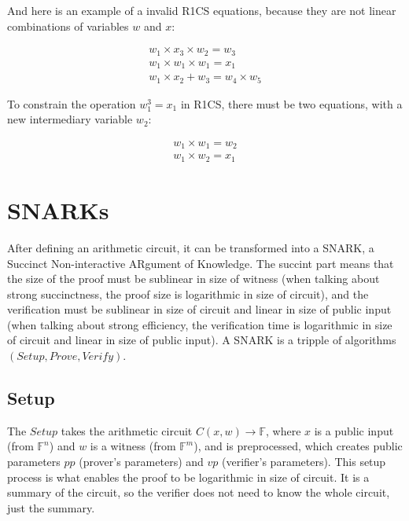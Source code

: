 And here is an example of a invalid R1CS equations, because they are not linear
combinations of variables $w$ and $x$:

\begin{displaymath}
	\begin{array}{l}
		w_1 \times x_3 \times w_2 = w_3	\\
		w_1 \times w_1 \times w_1 = x_1	\\
		w_1 \times x_2 + w_3 = w_4 \times w_5
	\end{array}
\end{displaymath}

To constrain the operation $w_1^3 = x_1$ in R1CS, there must be two equations, with
a new intermediary variable $w_2$:

\begin{displaymath}
	\begin{array}{l}
		w_1 \times w_1 = w_2	\\
		w_1 \times w_2 = x_1
	\end{array}
\end{displaymath}

\section{SNARKs}

After defining an arithmetic circuit, it can be transformed into a SNARK,
a Succinct Non-interactive ARgument of Knowledge. The succint part means that
the size of the proof must be sublinear in size of witness (when talking about
strong succinctness, the proof size is logarithmic in size of circuit), and
the verification must be sublinear in size of circuit and linear in size of
public input (when talking about strong efficiency, the verification time is
logarithmic in size of circuit and linear in size of public input).
A SNARK is a tripple of algorithms $(Setup, Prove, Verify)$.

\subsection{Setup}

The $Setup$ takes
the arithmetic circuit $C(x, w) \rightarrow \mathbb{F}$, where $x$ is a public
input (from $\mathbb{F}^n$) and $w$ is a witness (from $\mathbb{F}^m$), and
is preprocessed, which creates public parameters $pp$ (prover's parameters)
and $vp$ (verifier's parameters). This setup process is what enables the
proof to be logarithmic in size of circuit. It is a summary of the circuit,
so the verifier does not need to know the whole circuit, just the summary.

